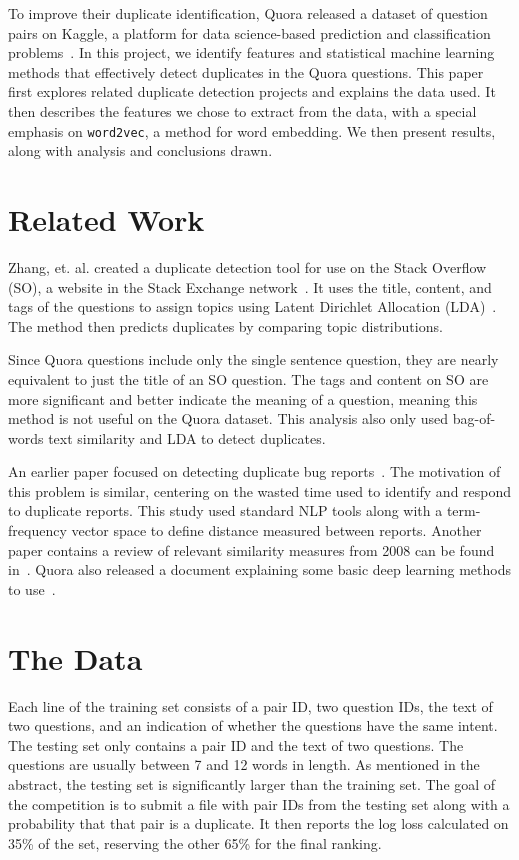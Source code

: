 \documentclass{article} %
\newcommand{\wordtvec}{\texttt{word2vec}}
\begin{document}
To improve their duplicate identification, Quora released a dataset of question pairs on Kaggle, a platform for data science-based prediction and classification problems~\cite{kaggleComp}. In this project, we identify features and statistical machine learning methods that effectively detect duplicates in the Quora questions. This paper first explores related duplicate detection projects and explains the data used. It then describes the features we chose to extract from the data, with a special emphasis on \wordtvec, a method for word embedding. We then present results, along with analysis and conclusions drawn. 

\section{Related Work}

Zhang, et. al. created a duplicate detection tool for use on the Stack Overflow (SO), a website in the Stack Exchange network~\cite{Zhang2015}. It uses the title, content, and tags of the questions to assign topics using Latent Dirichlet Allocation (LDA)~\cite{Blei03}. The method then predicts duplicates by comparing topic distributions.

Since Quora questions include only the single sentence question, they are nearly equivalent to just the title of an SO question. The tags and content on SO are more significant and better indicate the meaning of a question, meaning this method is not useful on the Quora dataset. This analysis also only used bag-of-words text similarity and LDA to detect duplicates.

An earlier paper focused on detecting duplicate bug reports~\cite{Runeson2007}. The motivation of this problem is similar, centering on the wasted time used to identify and respond to duplicate reports. This study used standard NLP tools along with a term-frequency vector space to define distance measured between reports. Another paper contains a review of relevant similarity measures from 2008 can be found in~\cite{acha08}. Quora also released a document explaining some basic deep learning methods to use~\cite{quora_eng}.

\section{The Data}

Each line of the training set consists of a pair ID, two question IDs, the text of two questions, and an indication of whether the questions have the same intent. The testing set only contains a pair ID and the text of two questions. The questions are usually between 7 and 12 words in length. As mentioned in the abstract, the testing set is significantly larger than the training set. The goal of the competition is to submit a file with pair IDs from the testing set along with a probability that that pair is a duplicate. It then reports the log loss calculated on 35\% of the set, reserving the other 65\% for the final ranking.
\end{document}
